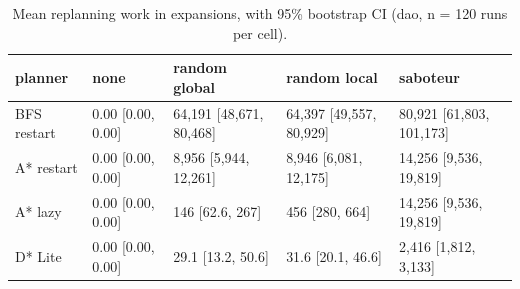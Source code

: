 \begin{table}[t]
\centering
\small
\caption{Mean replanning work in expansions, with 95\% bootstrap CI (dao, n = 120 runs per cell).}
\label{tab:replan-dao}
\begin{tabular}{lllll}
\toprule
planner & none & random global & random local & saboteur \\
\midrule
BFS restart & 0.00 [0.00, 0.00] & 64,191 [48,671, 80,468] & 64,397 [49,557, 80,929] & 80,921 [61,803, 101,173] \\
A* restart & 0.00 [0.00, 0.00] & 8,956 [5,944, 12,261] & 8,946 [6,081, 12,175] & 14,256 [9,536, 19,819] \\
A* lazy & 0.00 [0.00, 0.00] & 146 [62.6, 267] & 456 [280, 664] & 14,256 [9,536, 19,819] \\
D* Lite & 0.00 [0.00, 0.00] & 29.1 [13.2, 50.6] & 31.6 [20.1, 46.6] & 2,416 [1,812, 3,133] \\
\bottomrule
\end{tabular}
\end{table}
